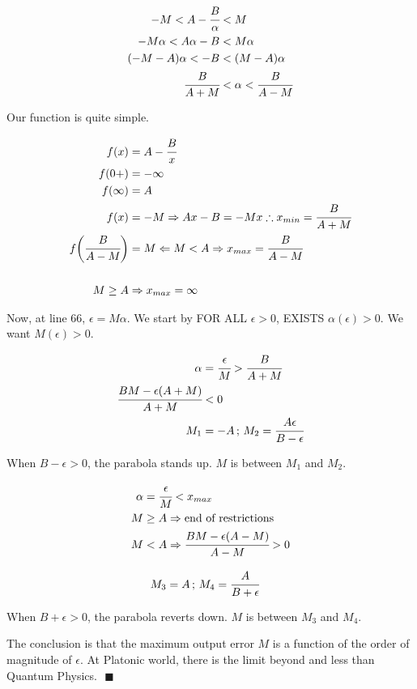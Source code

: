 \documentclass[11pt]{article}
\begin{document}
\begin{align}
  - M < A - \cfrac{B}{\alpha} &< M \\
  - M\alpha < A\alpha - B &< M \alpha \\
  (- M - A)\alpha < - B &< (M - A) \alpha \\
  \cfrac{B}{A + M} &< \alpha < \cfrac{B}{A - M}
\end{align}

Our function is quite simple.

\begin{align}
 f(x) &= A - \cfrac{B}{x} \\
 f(0+) &= - \infty \\
 f(\infty) &= A \\
 f(x) &= - M \Rightarrow Ax - B = - Mx \therefore x_{min} = \cfrac{B}{A + M} \\
 f\bigg(\cfrac{B}{A - M}\bigg) &= M \Leftarrow M < A \Rightarrow x_{max} = \cfrac{B}{A - M} \\
 \\
 M \ge A &\Rightarrow x_{max} = \infty
\end{align}

Now, at line 66, $\epsilon = M\alpha $. We start by FOR ALL $\epsilon > 0$, EXISTS $\alpha(\epsilon) > 0$. We want $M(\epsilon) > 0$.

\begin{align}
 \alpha &= \cfrac{\epsilon}{M} > \cfrac{B}{A + M} \\
 \cfrac{BM - \epsilon(A+M)}{A+M} &< 0 \\
 M_1 &= - A \,;\, M_2 = \cfrac{A \epsilon}{B - \epsilon}
\end{align}

When $B - \epsilon > 0$, the parabola stands up. $M$ is between $M_1$ and $M_2$.

\begin{align}
 \alpha &= \cfrac{\epsilon}{M} < x_{max} \\
 M &\ge A \Rightarrow \text{end of restrictions} \\
 M &< A \Rightarrow \cfrac{BM - \epsilon(A - M)}{A - M} > 0
\end{align}

\begin{align}
 M_3 &= A \,;\, M_4 = \cfrac{A}{B + \epsilon}
\end{align}

When $B + \epsilon > 0$, the parabola reverts down. $M$ is between $M_3$ and $M_4$.

The conclusion is that the maximum output error $M$ is a function of the order of magnitude of $\epsilon$. At Platonic world, there is the limit beyond and less than Quantum Physics. $\,\,\blacksquare$
\end{document}
